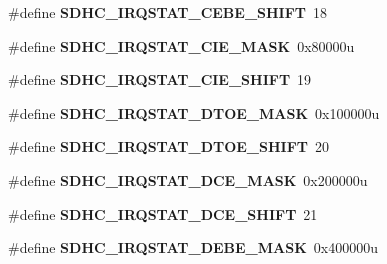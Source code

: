 \begin{DoxyCompactItemize}
\item 
\#define {\bfseries S\+D\+H\+C\+\_\+\+I\+R\+Q\+S\+T\+A\+T\+\_\+\+C\+E\+B\+E\+\_\+\+S\+H\+I\+FT}~18\hypertarget{group__SDHC__Register__Masks_ga0163cd5133f9fcd057aae342144534d1}{}\label{group__SDHC__Register__Masks_ga0163cd5133f9fcd057aae342144534d1}

\item 
\#define {\bfseries S\+D\+H\+C\+\_\+\+I\+R\+Q\+S\+T\+A\+T\+\_\+\+C\+I\+E\+\_\+\+M\+A\+SK}~0x80000u\hypertarget{group__SDHC__Register__Masks_gaee0c763af3fc323b0f3c35f3ad988e37}{}\label{group__SDHC__Register__Masks_gaee0c763af3fc323b0f3c35f3ad988e37}

\item 
\#define {\bfseries S\+D\+H\+C\+\_\+\+I\+R\+Q\+S\+T\+A\+T\+\_\+\+C\+I\+E\+\_\+\+S\+H\+I\+FT}~19\hypertarget{group__SDHC__Register__Masks_ga485d7f9c01d7b3188cdcaaf94c556707}{}\label{group__SDHC__Register__Masks_ga485d7f9c01d7b3188cdcaaf94c556707}

\item 
\#define {\bfseries S\+D\+H\+C\+\_\+\+I\+R\+Q\+S\+T\+A\+T\+\_\+\+D\+T\+O\+E\+\_\+\+M\+A\+SK}~0x100000u\hypertarget{group__SDHC__Register__Masks_ga1ddb5beb552cdc6193ebf649a9279bf9}{}\label{group__SDHC__Register__Masks_ga1ddb5beb552cdc6193ebf649a9279bf9}

\item 
\#define {\bfseries S\+D\+H\+C\+\_\+\+I\+R\+Q\+S\+T\+A\+T\+\_\+\+D\+T\+O\+E\+\_\+\+S\+H\+I\+FT}~20\hypertarget{group__SDHC__Register__Masks_gac0dd3b95df6da3006bb082622a655b37}{}\label{group__SDHC__Register__Masks_gac0dd3b95df6da3006bb082622a655b37}

\item 
\#define {\bfseries S\+D\+H\+C\+\_\+\+I\+R\+Q\+S\+T\+A\+T\+\_\+\+D\+C\+E\+\_\+\+M\+A\+SK}~0x200000u\hypertarget{group__SDHC__Register__Masks_ga48e68fbecd65304dfca83a00e76f03f2}{}\label{group__SDHC__Register__Masks_ga48e68fbecd65304dfca83a00e76f03f2}

\item 
\#define {\bfseries S\+D\+H\+C\+\_\+\+I\+R\+Q\+S\+T\+A\+T\+\_\+\+D\+C\+E\+\_\+\+S\+H\+I\+FT}~21\hypertarget{group__SDHC__Register__Masks_ga76f0e02634ba99e8b7dd3db03d6e9dc6}{}\label{group__SDHC__Register__Masks_ga76f0e02634ba99e8b7dd3db03d6e9dc6}

\item 
\#define {\bfseries S\+D\+H\+C\+\_\+\+I\+R\+Q\+S\+T\+A\+T\+\_\+\+D\+E\+B\+E\+\_\+\+M\+A\+SK}~0x400000u\hypertarget{group__SDHC__Register__Masks_gaff8f0d4c189f99dc324251e1c1486414}{}\label{group__SDHC__Register__Masks_gaff8f0d4c189f99dc324251e1c1486414}


\end{DoxyCompactItemize}
